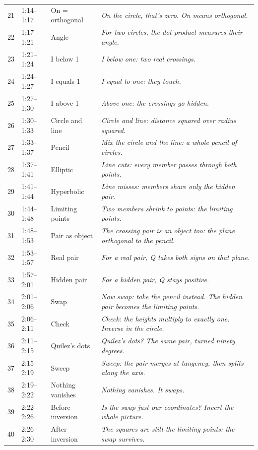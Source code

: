 \documentclass[10pt]{article}
\begin{document}
{\begin{longtable}{rllp{}}
21 & 1:14--1:17 & On = orthogonal & \emph{On the circle, that's zero. On means orthogonal.}\\
22 & 1:17--1:21 & Angle & \emph{For two circles, the dot product measures their angle.}\\
23 & 1:21--1:24 & I below 1 & \emph{I below one: two real crossings.}\\
24 & 1:24--1:27 & I equals 1 & \emph{I equal to one: they touch.}\\
25 & 1:27--1:30 & I above 1 & \emph{Above one: the crossings go hidden.}\\
26 & 1:30--1:33 & Circle and line & \emph{Circle and line: distance squared over radius squared.}\\
27 & 1:33--1:37 & Pencil & \emph{Mix the circle and the line: a whole pencil of circles.}\\
28 & 1:37--1:41 & Elliptic & \emph{Line cuts: every member passes through both points.}\\
29 & 1:41--1:44 & Hyperbolic & \emph{Line misses: members share only the hidden pair.}\\
30 & 1:44--1:48 & Limiting points & \emph{Two members shrink to points: the limiting points.}\\
31 & 1:48--1:53 & Pair as object & \emph{The crossing pair is an object too: the plane orthogonal to the pencil.}\\
32 & 1:53--1:57 & Real pair & \emph{For a real pair, Q takes both signs on that plane.}\\
33 & 1:57--2:01 & Hidden pair & \emph{For a hidden pair, Q stays positive.}\\
34 & 2:01--2:06 & Swap & \emph{Now swap: take the pencil instead. The hidden pair becomes the limiting points.}\\
35 & 2:06--2:11 & Check & \emph{Check: the heights multiply to exactly one. Inverse in the circle.}\\
36 & 2:11--2:15 & Quilez's dots & \emph{Quilez's dots? The same pair, turned ninety degrees.}\\
37 & 2:15--2:19 & Sweep & \emph{Sweep: the pair merges at tangency, then splits along the axis.}\\
38 & 2:19--2:22 & Nothing vanishes & \emph{Nothing vanishes. It swaps.}\\
39 & 2:22--2:26 & Before inversion & \emph{Is the swap just our coordinates? Invert the whole picture.}\\
40 & 2:26--2:30 & After inversion & \emph{The squares are still the limiting points: the swap survives.}\\

\end{longtable}}
\end{document}
